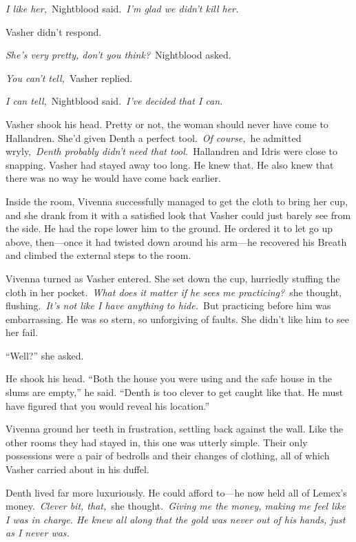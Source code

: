 \textit{I like her,}~Nightblood said.~\textit{I’m glad we didn’t kill her.}

Vasher didn’t respond.

\textit{She’s very pretty, don’t you think?}~Nightblood asked.

\textit{You can’t tell,}~Vasher replied.

\textit{I can tell,}~Nightblood said.~\textit{I’ve decided that I can.}

Vasher shook his head. Pretty or not, the woman should never have come to Hallandren. She’d given Denth a perfect tool.~\textit{Of course,}~he admitted wryly,~\textit{Denth probably didn’t need that tool.}~Hallandren and Idris were close to snapping. Vasher had stayed away too long. He knew that. He also knew that there was no way he would have come back earlier.

Inside the room, Vivenna successfully managed to get the cloth to bring her cup, and she drank from it with a satisfied look that Vasher could just barely see from the side. He had the rope lower him to the ground. He ordered it to let go up above, then—once it had twisted down around his arm—he recovered his Breath and climbed the external steps to the room.

\orn

Vivenna turned as Vasher entered. She set down the cup, hurriedly stuffing the cloth in her pocket.~\textit{What does it matter if he sees me practicing?}~she thought, flushing.~\textit{It’s not like I have anything to hide.}~But practicing before him was embarrassing. He was so stern, so unforgiving of faults. She didn’t like him to see her fail.

“Well?” she asked.

He shook his head. “Both the house you were using and the safe house in the slums are empty,” he said. “Denth is too clever to get caught like that. He must have figured that you would reveal his location.”

Vivenna ground her teeth in frustration, settling back against the wall. Like the other rooms they had stayed in, this one was utterly simple. Their only possessions were a pair of bedrolls and their changes of clothing, all of which Vasher carried about in his duffel.

Denth lived far more luxuriously. He could afford to—he now held all of Lemex’s money.~\textit{Clever bit, that,}~she thought.~\textit{Giving me the money, making me feel like I was in charge. He knew all along that the gold was never out of his hands, just as I never was.}

